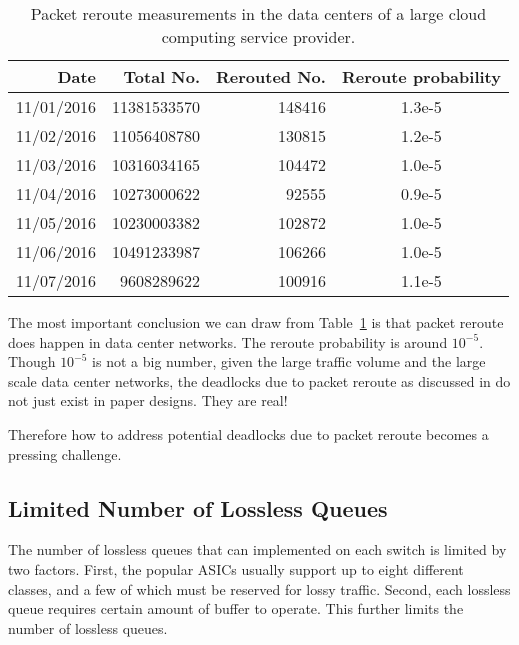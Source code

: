 \begin{table}[t]
\begin{small}
\begin{center}
\begin{tabular}{|r|r|r|c|}
\hline    Date    & Total No.  & Rerouted No.   & Reroute probability \\
\hline 11/01/2016 & 11381533570 & 148416 &  1.3e-5 \\
\hline 11/02/2016 & 11056408780 & 130815 &  1.2e-5 \\
\hline 11/03/2016 & 10316034165 & 104472 &  1.0e-5 \\
\hline 11/04/2016 & 10273000622 & 92555  &  0.9e-5 \\
\hline 11/05/2016 & 10230003382 & 102872 &  1.0e-5 \\
\hline 11/06/2016 & 10491233987 & 106266 &  1.0e-5 \\
\hline 11/07/2016 & 9608289622  & 100916 &  1.1e-5 \\
\hline
\end{tabular}
\end{center}
\caption{Packet reroute measurements in the data centers of a large cloud computing service provider.}\label{fig:reroute}
\end{small}
\end{table}

The most important conclusion we can draw from Table~\ref{fig:reroute} is that packet reroute does happen in data center networks. The reroute probability is around $10^{-5}$. Though $10^{-5}$ is not a big number, given the large traffic volume and the large scale data center networks, the deadlocks due to packet reroute as discussed in \cite{rdmaatscale,shpiner2016unlocking,hu2016deadlocks} do not just exist in paper designs. They are real!

Therefore how to address potential deadlocks due to packet reroute becomes a pressing challenge.


\subsection{Limited Number of Lossless Queues}\label{subsec:pfcheadroom}

The number of lossless queues that can implemented on each switch is limited by two factors. First, the popular ASICs usually support up to eight different classes,
and a few of which must be reserved for lossy traffic. Second, each lossless queue requires certain amount of buffer to operate. This further limits the number of
lossless queues.

